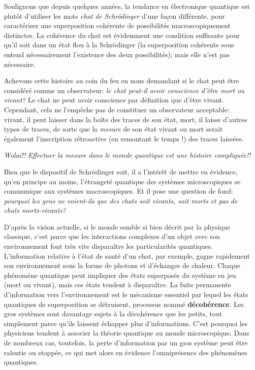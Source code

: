 Soulignons que depuis quelques années, la tendance en électronique quantique
est plutôt d'utiliser les mots \emph{chat de Schrödinger} d'une façon
différente, pour caractériser une superposition cohérente de possibilités
macroscopiquement distinctes. La cohérence du chat est évidemment une
condition suffisante pour qu'il soit dans un état flou à la Schrödinger (la
superposition cohérente sous entend nécessairement l'existence des deux
possibilités); mais elle n'est pas nécessaire.

Achevons cette histoire au coin du feu en nous demandant si le chat peut être
considéré comme un observateur: \emph{le chat peut-il avoir conscience d'être
mort ou vivant?} Le chat ne peut avoir conscience par définition que d'être
vivant. Cependant, cela ne l'empêche pas de constituer un observateur
acceptable: vivant, il peut laisser dans la boîte des traces de son état, mort,
il laisse d'autres types de traces, de sorte que la \emph{mesure} de son état
vivant ou mort serait également l'inscription rétroactive (en remontant le temps
!) des traces laissées.
\bigskip

\emph{Wolai!! Effectuer la mesure dans le monde quantique est une histoire
compliquée!!}

\begin{remark}

\begin{small}
Bien que le dispositif de Schrödinger soit, il a l'intérêt de mettre en
évidence, qu'en principe au moins, l'étrangeté quantique des systèmes
microscopiques se communique aux systèmes macroscopiques. Et il pose une
question de fond: \emph{pourquoi les gens ne voient-ils que des chats soit
vivants, soit morts et pas de chats morts-vivants?}

D'après la vision actuelle, si le monde semble si bien décrit par la physique
classique, c'est parce que les interactions complexes d'un objet avec son
environnement font très vite disparaître les particularités quantiques.
L'information relative à l'état de santé d'un chat, par exemple, gagne
rapidement son environnement sous la forme de photons et d'échanges de chaleur.
Chaque phénomène quantique peut impliquer des états superposés du système en jeu
(mort ou vivant), mais ces états tendent à disparaître. La fuite permanente
d'information vers l'environnement est le mécanisme essentiel par lequel les
états quantiques de superposition se détruisent, processus nommé
\textbf{décohérence}. Les gros systèmes sont davantage sujets à la décohérence
que les petits, tout simplement parce qu'ils laissent échapper plus
d'informations. C'est pourquoi les physiciens tendent à associer la théorie
quantique au monde microscopique. Dans de nombreux cas, toutefois, la perte
d'information par un gros système peut être ralentie ou stoppée, ce qui met
alors en évidence l'omniprésence des phénomènes quantiques.
\end{small}

\end{remark}

